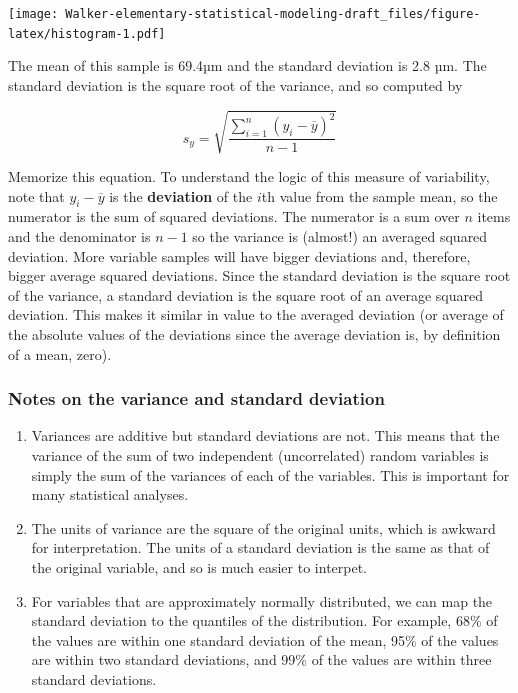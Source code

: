 \documentclass[]{book}
\providecommand{\tightlist}{%
  \setlength{\itemsep}{0pt}\setlength{\parskip}{0pt}}
\begin{document}
\texttt{[image: Walker-elementary-statistical-modeling-draft\_files/figure-latex/histogram-1.pdf]}

The mean of this sample is 69.4µm and the standard deviation is 2.8 µm. The standard deviation is the square root of the variance, and so computed by

\begin{equation}
s_y = \sqrt{\frac{\sum_{i=1}^n{(y_i - \overline{y})^2}}{n-1}}
\label{eq:variance}
\end{equation}

Memorize this equation. To understand the logic of this measure of variability, note that \(y_i - \overline{y}\) is the \textbf{deviation} of the \(i\)th value from the sample mean, so the numerator is the sum of squared deviations. The numerator is a sum over \(n\) items and the denominator is \(n-1\) so the variance is (almost!) an averaged squared deviation. More variable samples will have bigger deviations and, therefore, bigger average squared deviations. Since the standard deviation is the square root of the variance, a standard deviation is the square root of an average squared deviation. This makes it similar in value to the averaged deviation (or average of the absolute values of the deviations since the average deviation is, by definition of a mean, zero).

\hypertarget{notes-on-the-variance-and-standard-deviation}{%
\subsubsection{Notes on the variance and standard deviation}\label{notes-on-the-variance-and-standard-deviation}}

\begin{enumerate}
\def\labelenumi{\arabic{enumi}.}
\tightlist
\item
  Variances are additive but standard deviations are not. This means that the variance of the sum of two independent (uncorrelated) random variables is simply the sum of the variances of each of the variables. This is important for many statistical analyses.
\item
  The units of variance are the square of the original units, which is awkward for interpretation. The units of a standard deviation is the same as that of the original variable, and so is much easier to interpet.
\item
  For variables that are approximately normally distributed, we can map the standard deviation to the quantiles of the distribution. For example, 68\% of the values are within one standard deviation of the mean, 95\% of the values are within two standard deviations, and 99\% of the values are within three standard deviations.
\end{enumerate}
\end{document}

